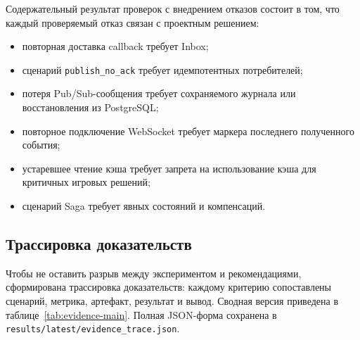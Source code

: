 \documentclass[a4paper,14pt]{extarticle}
\numberwithin{figure}{section}
\numberwithin{table}{section}
\begin{document}
Содержательный результат проверок с внедрением отказов состоит в том, что каждый проверяемый отказ связан с проектным решением:
\begin{itemize}
\item повторная доставка callback требует Inbox;
\item сценарий \texttt{publish\_no\_ack} требует идемпотентных потребителей;
\item потеря Pub/Sub-сообщения требует сохраняемого журнала или восстановления из PostgreSQL;
\item повторное подключение WebSocket требует маркера последнего полученного события;
\item устаревшее чтение кэша требует запрета на использование кэша для критичных игровых решений;
\item сценарий Saga требует явных состояний и компенсаций.
\end{itemize}

\subsection{Трассировка доказательств}
Чтобы не оставить разрыв между экспериментом и рекомендациями, сформирована трассировка доказательств: каждому критерию сопоставлены сценарий, метрика, артефакт, результат и вывод. Сводная версия приведена в таблице~\ref{tab:evidence-main}. Полная JSON-форма сохранена в \texttt{results/latest/evidence\_trace.json}.
\end{document}
